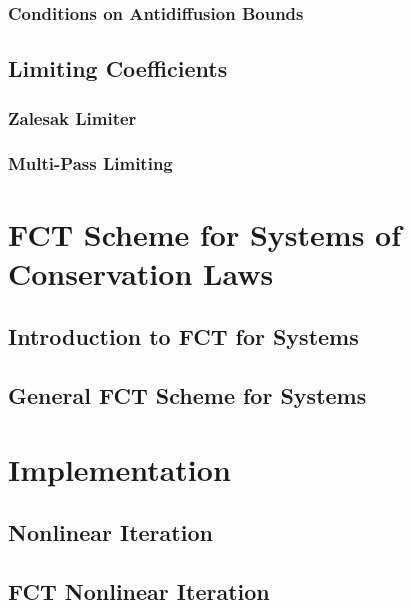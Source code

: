   \subsubsection{Conditions on Antidiffusion Bounds
    \label{sec:antidiffusion_bounds_signs}}
    
\subsection{Limiting Coefficients\label{sec:limiting_coefficients_scalar}}
  
  \subsubsection{Zalesak Limiter\label{sec:zalesak_limiter}}
    
  \subsubsection{Multi-Pass Limiting\label{sec:multipass_limiting}}
    
\section{FCT Scheme for Systems of Conservation Laws\label{sec:fct_systems}}
\subsection{Introduction to FCT for Systems\label{sec:fct_systems_introduction}}
  
\subsection{General FCT Scheme for Systems\label{sec:fct_systems_scheme}}
  
\section{Implementation\label{sec:implementation}}
\subsection{Nonlinear Iteration\label{sec:nonlinear_iteration}}
  
\subsection{FCT Nonlinear Iteration
  \label{sec:fct_nonlinear_iteration}}
  
%  

